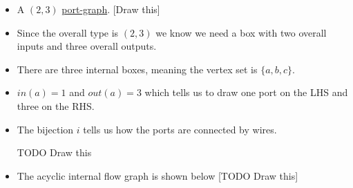 \begin{itemize}
    \item A $(2,3)$ \href{doc/1 math/Seven Sketches in Compositionality/Chapter 5: Signal flow graphs/2 Props and presentations/2 The prop of port graphs/1 Port graph}{port-graph}. [Draw this]
    \item Since the overall type is $(2,3)$ we know we need a box with two overall inputs and three overall outputs.
    \item There are three internal boxes, meaning the vertex set is $\{a, b, c\}$.
    \item $in(a)=1$ and $out(a)=3$ which tells us to draw one port on the LHS and three on the RHS.
    \item The bijection $i$ tells us how the ports are connected by wires.
    \item [TODO Draw this]
    \item The acyclic internal flow graph is shown below [TODO Draw this]
  \end{itemize}

